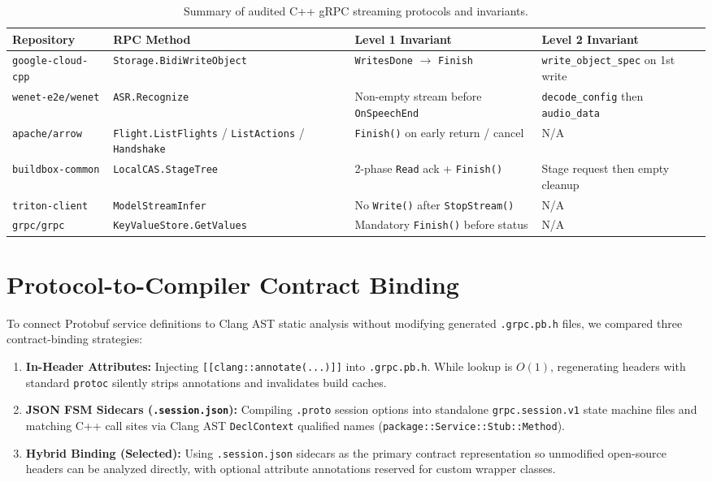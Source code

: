 \documentclass[11pt,a4paper]{article}
\begin{document}
\begin{table}[htbp]
\centering
\small
\begin{tabular}{@{}llll@{}}
\toprule
\textbf{Repository} & \textbf{RPC Method} & \textbf{Level 1 Invariant} & \textbf{Level 2 Invariant} \\
\midrule
\texttt{google-cloud-cpp} & \texttt{Storage.BidiWriteObject} & \texttt{WritesDone} $\to$ \texttt{Finish} & \texttt{write\_object\_spec} on 1st write \\
\texttt{wenet-e2e/wenet} & \texttt{ASR.Recognize} & Non-empty stream before \texttt{OnSpeechEnd} & \texttt{decode\_config} then \texttt{audio\_data} \\
\texttt{apache/arrow} & \texttt{Flight.ListFlights} / \texttt{ListActions} / \texttt{Handshake} & \texttt{Finish()} on early return / cancel & N/A \\
\texttt{buildbox-common} & \texttt{LocalCAS.StageTree} & 2-phase \texttt{Read} ack + \texttt{Finish()} & Stage request then empty cleanup \\
\texttt{triton-client} & \texttt{ModelStreamInfer} & No \texttt{Write()} after \texttt{StopStream()} & N/A \\
\texttt{grpc/grpc} & \texttt{KeyValueStore.GetValues} & Mandatory \texttt{Finish()} before status & N/A \\
\bottomrule
\end{tabular}
\caption{Summary of audited C++ gRPC streaming protocols and invariants.}
\label{tab:audited-repos}
\end{table}

\section{Protocol-to-Compiler Contract Binding}

To connect Protobuf service definitions to Clang AST static analysis without modifying generated \texttt{.grpc.pb.h} files, we compared three contract-binding strategies:
\begin{enumerate}
    \item \textbf{In-Header Attributes:} Injecting \texttt{[[clang::annotate(...)]]} into \texttt{.grpc.pb.h}. While lookup is $O(1)$, regenerating headers with standard \texttt{protoc} silently strips annotations and invalidates build caches.
    \item \textbf{JSON FSM Sidecars (\texttt{.session.json}):} Compiling \texttt{.proto} session options into standalone \texttt{grpc.session.v1} state machine files and matching C++ call sites via Clang AST \texttt{DeclContext} qualified names (\texttt{package::Service::Stub::Method}).
    \item \textbf{Hybrid Binding (Selected):} Using \texttt{.session.json} sidecars as the primary contract representation so unmodified open-source headers can be analyzed directly, with optional attribute annotations reserved for custom wrapper classes.
\end{enumerate}
\end{document}
